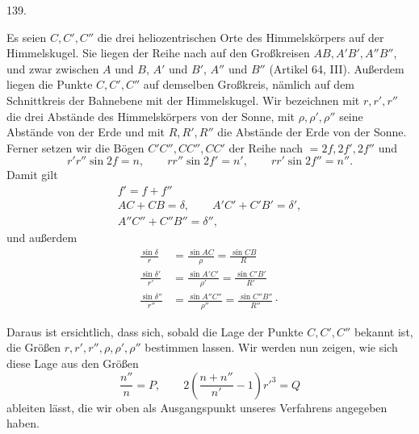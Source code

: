 \par{}\medskip
\begin{center}\hypertarget{native-186-article139}{}139.\end{center}
Es seien $C,C',C''$ die drei heliozentrischen Orte des Himmelskörpers auf der Himmelskugel. Sie
liegen der Reihe nach auf den Großkreisen $AB,A'B',A''B''$, und zwar zwischen $A$ und $B$, $A'$ und
$B'$, $A''$ und $B''$ (Artikel 64, III). Außerdem liegen die Punkte $C,C',C''$ auf demselben
Großkreis, nämlich auf dem Schnittkreis der Bahnebene mit der Himmelskugel. Wir
bezeichnen mit $r,r',r''$ die drei Abstände des Himmelskörpers von der Sonne, mit $\rho,\rho',\rho''$ seine
Abstände von der Erde und mit $R,R',R''$ die Abstände der Erde von der Sonne. Ferner setzen wir die
Bögen $C'C'',CC'',CC'$ der Reihe nach $=2f,2f',2f''$ und
\[
r'r''\sin2f=n,\qquad rr''\sin2f'=n',\qquad rr'\sin2f''=n''.
\]
\hypertarget{native-187}{}Damit gilt
\[
\begin{gathered}
f'=f+f''\\[.4ex]
AC+CB=\delta,\qquad A'C'+C'B'=\delta',\\[.4ex]
A''C''+C''B''=\delta'',
\end{gathered}
\]
und außerdem
\[
\begin{aligned}
\frac{\sin\delta}{r}&=\frac{\sin AC}{\rho}=\frac{\sin CB}{R}\\[.7ex]
\frac{\sin\delta'}{r'}&=\frac{\sin A'C'}{\rho'}=\frac{\sin C'B'}{R'}\\[.7ex]
\frac{\sin\delta''}{r''}&=\frac{\sin A''C''}{\rho''}=\frac{\sin C''B''}{R''}\mathpunct{\cdot}
\end{aligned}
\]

Daraus ist ersichtlich, dass sich, sobald die Lage der Punkte $C,C',C''$ bekannt ist, die Größen
$r,r',r'',\rho,\rho',\rho''$ bestimmen lassen. Wir werden nun zeigen, wie sich diese Lage aus den Größen
\[
\frac{n''}{n}=P,\qquad 2\left(\frac{n+n''}{n'}-1\right)r'^3=Q
\]
ableiten lässt, die wir oben als Ausgangspunkt unseres Verfahrens angegeben haben.

